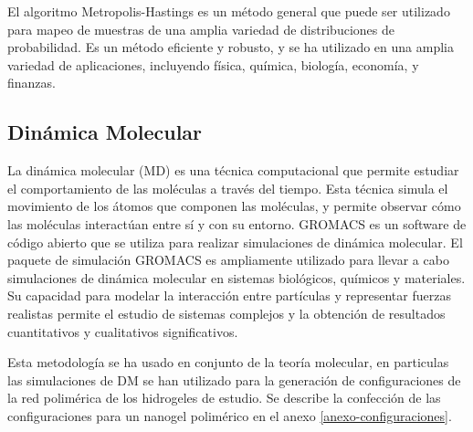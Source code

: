 El algoritmo Metropolis-Hastings es un m\'etodo general que puede ser utilizado para mapeo de muestras de una amplia variedad de distribuciones de probabilidad. Es un m\'etodo eficiente y robusto, y se ha utilizado en una amplia variedad de aplicaciones, incluyendo f\'isica, qu\'imica, biolog\'ia, econom\'ia, y finanzas.\cite{sin2020applications}

\subsection{Din\'amica Molecular}

La din\'amica molecular (MD) es una t\'ecnica computacional que permite estudiar el comportamiento de las mol\'eculas a trav\'es del tiempo. Esta t\'ecnica simula el movimiento de los \'atomos que componen las mol\'eculas, y permite observar c\'omo las mol\'eculas interact\'uan entre s\'i y con su entorno.
GROMACS es un software de c\'odigo abierto que se utiliza para realizar simulaciones de din\'amica molecular. \cite{lindahl2001gromacs}
El paquete de simulaci\'on GROMACS es ampliamente utilizado para llevar a cabo simulaciones de din\'amica molecular en sistemas biol\'ogicos, qu\'imicos y materiales. Su capacidad para modelar la interacci\'on entre part\'iculas y representar fuerzas realistas permite el estudio de sistemas complejos y la obtenci\'on de resultados cuantitativos y cualitativos significativos.

Esta metodolog\'ia se ha usado en conjunto de la teor\'ia molecular, en particulas las simulaciones de DM se han utilizado para la generaci\'on de configuraciones  de la red polim\'erica de los hidrogeles de estudio. Se describe la confecci\'on de las configuraciones para un nanogel polim\'erico en el anexo \ref{anexo-configuraciones}.







